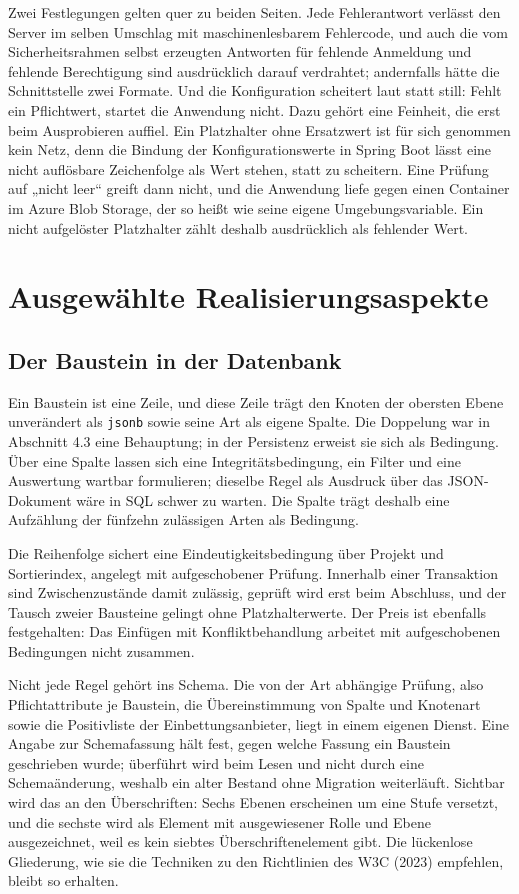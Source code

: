 Zwei Festlegungen gelten quer zu beiden Seiten. Jede Fehlerantwort verlässt den Server im selben Umschlag mit maschinenlesbarem Fehlercode, und auch die vom Sicherheitsrahmen selbst erzeugten Antworten für fehlende Anmeldung und fehlende Berechtigung sind ausdrücklich darauf verdrahtet; andernfalls hätte die Schnittstelle zwei Formate. Und die Konfiguration scheitert laut statt still: Fehlt ein Pflichtwert, startet die Anwendung nicht. Dazu gehört eine Feinheit, die erst beim Ausprobieren auffiel. Ein Platzhalter ohne Ersatzwert ist für sich genommen kein Netz, denn die Bindung der Konfigurationswerte in Spring Boot lässt eine nicht auflösbare Zeichenfolge als Wert stehen, statt zu scheitern. Eine Prüfung auf „nicht leer“ greift dann nicht, und die Anwendung liefe gegen einen Container im Azure Blob Storage, der so heißt wie seine eigene Umgebungsvariable. Ein nicht aufgelöster Platzhalter zählt deshalb ausdrücklich als fehlender Wert.

\section{Ausgewählte Realisierungsaspekte}
\label{sec:realisierungsaspekte}

\subsection{Der Baustein in der Datenbank}

Ein Baustein ist eine Zeile, und diese Zeile trägt den Knoten der obersten Ebene unverändert als \texttt{jsonb} sowie seine Art als eigene Spalte. Die Doppelung war in Abschnitt 4.3 eine Behauptung; in der Persistenz erweist sie sich als Bedingung. Über eine Spalte lassen sich eine Integritätsbedingung, ein Filter und eine Auswertung wartbar formulieren; dieselbe Regel als Ausdruck über das JSON-Dokument wäre in SQL schwer zu warten. Die Spalte trägt deshalb eine Aufzählung der fünfzehn zulässigen Arten als Bedingung.

Die Reihenfolge sichert eine Eindeutigkeitsbedingung über Projekt und Sortierindex, angelegt mit aufgeschobener Prüfung. Innerhalb einer Transaktion sind Zwischenzustände damit zulässig, geprüft wird erst beim Abschluss, und der Tausch zweier Bausteine gelingt ohne Platzhalterwerte. Der Preis ist ebenfalls festgehalten: Das Einfügen mit Konfliktbehandlung arbeitet mit aufgeschobenen Bedingungen nicht zusammen.

Nicht jede Regel gehört ins Schema. Die von der Art abhängige Prüfung, also Pflichtattribute je Baustein, die Übereinstimmung von Spalte und Knotenart sowie die Positivliste der Einbettungsanbieter, liegt in einem eigenen Dienst. Eine Angabe zur Schemafassung hält fest, gegen welche Fassung ein Baustein geschrieben wurde; überführt wird beim Lesen und nicht durch eine Schemaänderung, weshalb ein alter Bestand ohne Migration weiterläuft. Sichtbar wird das an den Überschriften: Sechs Ebenen erscheinen um eine Stufe versetzt, und die sechste wird als Element mit ausgewiesener Rolle und Ebene ausgezeichnet, weil es kein siebtes Überschriftenelement gibt. Die lückenlose Gliederung, wie sie die Techniken zu den Richtlinien des W3C (2023) empfehlen, bleibt so erhalten.

